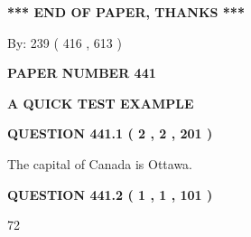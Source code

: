 \documentclass[12pt]{article}
\begin{document}
 
 
 
   
   
 \vspace{0.2in}
 
   
   
   
   
\vspace{1.0in} 
{\textbf{\large{ *** END OF PAPER, THANKS *** }}} 
   
   
\hspace{1.0in} By: 
 239 ( 416 ,  613 )
   
   
   
   
\newpage 
\setcounter{page}{ 
   441001 } 
   
   
   
   
 {\textbf{ \Large{ PAPER NUMBER  441  }}}
   
   
\vspace{0.2in}
   
   
   
   
   
   
 \vspace{0.2in}
{\LARGE {\textbf{ A QUICK TEST EXAMPLE}}}
   
   
  
\vspace{0.2in}
  
{\textbf{\Large{QUESTION
441.1 
 ( 2 , 2 , 201 )
}}}
  
  
 
 
\noindent{}
 
 
The capital of Canada is Ottawa.
 
 
 
 
  
\vspace{0.2in}
  
{\textbf{\Large{QUESTION
441.2 
 ( 1 , 1 , 101 )
}}}
  
  
 
 
\noindent{}

72
 
 
   
   
 \vspace{0.2in}
 
   
   
   
   
\end{document}
